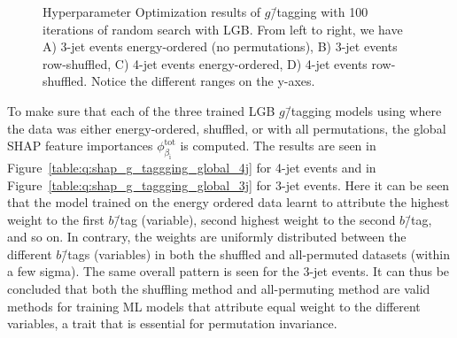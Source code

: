\begin{figure}%
  \centering
  \;
  \vspace{2mm}
  \caption[Hyperparameter Optimization of $g$\=/tagging]{
    Hyperparameter Optimization results of $g$\=/tagging with \num{100} iterations of random search with LGB. From left to right, we have A) 3-jet events energy-ordered (no permutations), B) 3-jet events row-shuffled, C) 4-jet events energy-ordered, D) 4-jet events row-shuffled. Notice the different ranges on the y-axes.}
  \label{fig:q:CV_res_iterations_g_tagging}%
\end{figure}

To make sure that each of the three trained LGB $g$\=/tagging models using where the data was either energy-ordered, shuffled, or with all permutations, the global SHAP feature importances $\phi^\mathrm{tot}_{\beta_\mathrm{i}}$ is computed. The results are seen in Figure~\ref{table:q:shap_g_taggging_global_4j} for 4-jet events and in Figure~\ref{table:q:shap_g_taggging_global_3j} for 3-jet events. Here it can be seen that the model trained on the energy ordered data learnt to attribute the highest weight to the first $b$\=/tag (variable), second highest weight to the second $b$\=/tag, and so on. In contrary, the weights are uniformly distributed between the different $b$\=/tags (variables) in both the shuffled and all-permuted datasets (within a few sigma). The same overall pattern is seen for the 3-jet events. It can thus be concluded that both the shuffling method and all-permuting method are valid methods for training ML models that attribute equal weight to the different variables, a trait that is essential for permutation invariance. 

